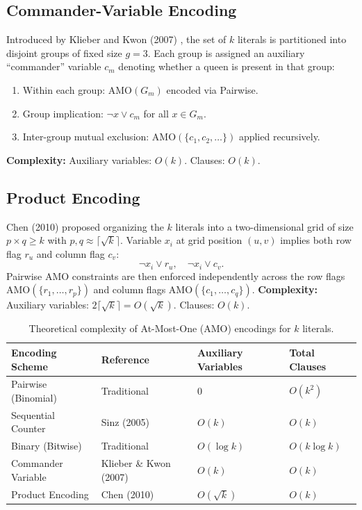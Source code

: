 \documentclass[a4paper,fleqn]{cas-sc}
\begin{document}
\subsection{Commander-Variable Encoding}
Introduced by Klieber and Kwon (2007) \cite{klieber2007solving}, the set of $k$ literals is partitioned into disjoint groups of fixed size $g = 3$. Each group is assigned an auxiliary ``commander'' variable $c_m$ denoting whether a queen is present in that group:
\begin{enumerate}
    \item Within each group: $\text{AMO}(G_m)$ encoded via Pairwise.
    \item Group implication: $\neg x \lor c_m$ for all $x \in G_m$.
    \item Inter-group mutual exclusion: $\text{AMO}(\{c_1, c_2, \dots\})$ applied recursively.
\end{enumerate}
\textbf{Complexity:} Auxiliary variables: $O(k)$. Clauses: $O(k)$.

\subsection{Product Encoding}
Chen (2010) \cite{chen2010new} proposed organizing the $k$ literals into a two-dimensional grid of size $p \times q \ge k$ with $p, q \approx \lceil \sqrt{k} \rceil$. Variable $x_i$ at grid position $(u, v)$ implies both row flag $r_u$ and column flag $c_v$:
\begin{equation}
\neg x_i \lor r_u, \quad \neg x_i \lor c_v.
\end{equation}
Pairwise AMO constraints are then enforced independently across the row flags $\text{AMO}(\{r_1, \dots, r_p\})$ and column flags $\text{AMO}(\{c_1, \dots, c_q\})$.
\textbf{Complexity:} Auxiliary variables: $2\lceil \sqrt{k} \rceil = O(\sqrt{k})$. Clauses: $O(k)$.

\begin{table}[ht]
\centering
\caption{Theoretical complexity of At-Most-One (AMO) encodings for $k$ literals.}
\label{tab:complexity}
\begin{tabular*}{\tblwidth}{@{}llll@{}}
\toprule
Encoding Scheme & Reference & Auxiliary Variables & Total Clauses \\
\midrule
Pairwise (Binomial) & Traditional & $0$ & $O(k^2)$ \\
Sequential Counter  & Sinz (2005) \cite{sinz2005towards} & $O(k)$ & $O(k)$ \\
Binary (Bitwise)    & Traditional & $O(\log k)$ & $O(k \log k)$ \\
Commander Variable  & Klieber \& Kwon (2007) \cite{klieber2007solving} & $O(k)$ & $O(k)$ \\
Product Encoding    & Chen (2010) \cite{chen2010new} & $O(\sqrt{k})$ & $O(k)$ \\
\bottomrule
\end{tabular*}
\end{table}
\end{document}
